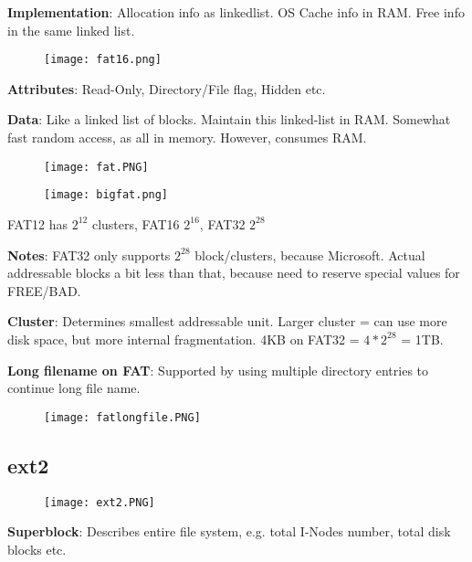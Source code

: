 \documentclass[a4paper,landscape]{article}
\newcommand{\rntopic}[1]{\vspace{-1.5em}\subsection*{#1}\vspace{-0.5em}}
\newcommand{\rnname}[1]{\textbf{#1}}
\begin{document}
\begin{multicols*}{4}
\begin{flatitemize}
\vspace{-1.5em}
\item \rnname{Implementation}: Allocation info as linkedlist. OS Cache info in RAM. Free info in the same linked list. 
\vspace{-1.5em}
\begin{figure}[H]
  \texttt{[image: fat16.png]}
\end{figure}
\vspace{-1.5em}
\item \rnname{Attributes}: Read-Only, Directory/File flag, Hidden etc.
\item \rnname{Data}: Like a linked list of blocks. Maintain this linked-list in RAM. Somewhat fast random access, as all in memory. However, consumes RAM.
\vspace{-1.5em}
\begin{figure}[H]
  \texttt{[image: fat.PNG]}
\end{figure}
\vspace{-1.5em}
\vspace{-1.5em}
\begin{figure}[H]
  \texttt{[image: bigfat.png]}
\end{figure}
\vspace{-1.5em}
\item FAT12 has $2^{12}$ clusters, FAT16 $2^{16}$, FAT32 $2^{28}$
\item \rnname{Notes}: FAT32 only supports $2^{28}$ block/clusters, because Microsoft. Actual addressable blocks a bit less than that, because need to reserve special values for FREE/BAD. 
\item \rnname{Cluster}: Determines smallest addressable unit. Larger cluster = can use more disk space, but more internal fragmentation. 4KB on FAT32 = $4 * 2^{28}$ = 1TB.
\item \rnname{Long filename on FAT}: Supported by using multiple directory entries to continue long file name. 
\vspace{-1.5em}
\begin{figure}[H]
  \texttt{[image: fatlongfile.PNG]}
\end{figure}
\vspace{-1.5em}
\rntopic{ext2}
\vspace{-1.5em}
\begin{figure}[H]
  \texttt{[image: ext2.PNG]}
\end{figure}
\vspace{-1.5em}
\item \rnname{Superblock}: Describes entire file system, e.g. total I-Nodes number, total disk blocks etc.

\end{flatitemize}
\end{multicols*}
\end{document}
